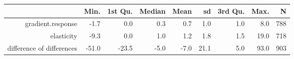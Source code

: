 \begin{table}[ht]
\centering
\begin{tabular}{rrrrrrrrr}
  \hline
 & Min. & 1st Qu. & Median & Mean & sd & 3rd Qu. & Max. & N \\ 
  \hline
gradient.response & -1.7 & 0.0 & 0.3 & 0.7 & 1.0 & 1.0 & 8.0 & 788 \\ 
  elasticity & -9.3 & 0.0 & 1.0 & 1.2 & 1.8 & 1.5 & 19.0 & 718 \\ 
  difference of differences & -51.0 & -23.5 & -5.0 & -7.0 & 21.1 & 5.0 & 93.0 & 903 \\ 
   \hline
\end{tabular}
\end{table}
